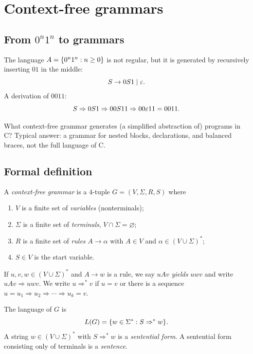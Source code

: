 \section{Context-free grammars}

\subsection{From \texorpdfstring{$0^n1^n$}{0n1n} to grammars}
The language $A=\{0^n1^n:n\geq 0\}$ is not regular, but it is generated by
recursively inserting $01$ in the middle:
\[
  S\to 0S1\mid\varepsilon.
\]
A derivation of $0011$:
\[
  S\Rightarrow 0S1\Rightarrow 00S11\Rightarrow 00\varepsilon 11=0011.
\]

\begin{exercise}
What context-free grammar generates (a simplified abstraction of) programs
in C? Typical answer: a grammar for nested blocks, declarations, and
balanced braces, not the full language of C.
\end{exercise}

\subsection{Formal definition}
\begin{definition}
A \emph{context-free grammar} is a $4$-tuple $G=(V,\Sigma,R,S)$ where
\begin{enumerate}
  \item $V$ is a finite set of \emph{variables} (nonterminals);
  \item $\Sigma$ is a finite set of \emph{terminals}, $V\cap\Sigma=\varnothing$;
  \item $R$ is a finite set of \emph{rules} $A\to\alpha$ with $A\in V$ and
        $\alpha\in(V\cup\Sigma)^*$;
  \item $S\in V$ is the start variable.
\end{enumerate}
\end{definition}

If $u,v,w\in(V\cup\Sigma)^*$ and $A\to w$ is a rule, we say $uAv$
\emph{yields} $uwv$ and write $uAv\Rightarrow uwv$. We write $u\Rightarrow^* v$
if $u=v$ or there is a sequence $u=u_1\Rightarrow u_2\Rightarrow\cdots\Rightarrow u_k=v$.

The language of $G$ is
\[
  L(G)=\{w\in\Sigma^*:S\Rightarrow^* w\}.
\]
A string $w\in(V\cup\Sigma)^*$ with $S\Rightarrow^* w$ is a \emph{sentential
form}. A sentential form consisting only of terminals is a \emph{sentence}.

